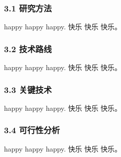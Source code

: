 
\subsubsection{3.1 研究方法}


happy happy happy.
快乐 快乐 快乐。

\subsubsection{3.2 技术路线}

happy happy happy.
快乐 快乐 快乐。


\subsubsection{3.3 关键技术}

happy happy happy.
快乐 快乐 快乐。

\subsubsection{3.4 可行性分析}


happy happy happy.
快乐 快乐 快乐。
